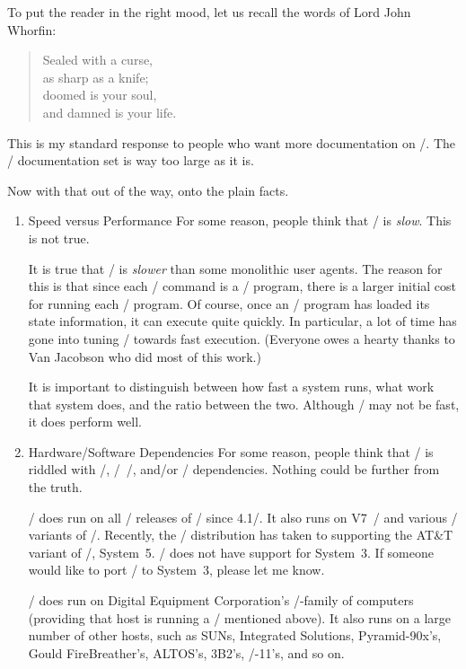 To put the reader in the right mood,
let us recall the words of Lord John Whorfin:

\begin{verse}
Sealed with a curse,\\
\qquad as sharp as a knife;\\
doomed is your soul,\\
\qquad and damned is your life.
\end{verse}

This is my standard response to people who want more documentation on \MH/.
The \MH/ documentation set is way too large as it is.

Now with that out of the way,
onto the plain facts.

\begin{enumerate}
\item	Speed versus Performance\hbreak
For some reason,
people think that \MH/ is {\em slow}.
This is not true.

It is true that \MH/ is {\em slower\/} than some monolithic user agents.
The reason for this is that since each \MH/ command is a \unix/ program,
there is a larger initial cost for running each \MH/ program.
Of course,
once an \MH/ program has loaded its state information,
it can execute quite quickly.
In particular,
a lot of time has gone into tuning \MH/ towards fast execution.
(Everyone owes a hearty thanks to Van Jacobson who did most of this work.)

It is important to distinguish between how fast a system runs,
what work that system does,
and the ratio between the two.
Although \MH/ may not be fast,
it does perform well.

\item	Hardware/Software Dependencies\hbreak
For some reason,
people think that \MH/ is riddled with \vax/, \bsd/~\unix/, and/or \SendMail/
dependencies.
Nothing could be further from the truth.

\MH/ does run on all \bsd/ releases of \unix/ since 4.1\bsd/.
It also runs on V7~\unix/ and various \xenix/ variants of \unix/.
Recently, the \MH/ distribution has taken to supporting the AT\&T variant of
\unix/, System~5.
\MH/ does not have support for System~3.
If someone would like to port \MH/ to System~3,
please let me know.

\MH/ does run on Digital Equipment Corporation's \vax/-family of computers
(providing that host is running a \unix/ mentioned above).
It also runs on a large number of other hosts,
such as SUNs, Integrated Solutions, Pyramid-90x's, Gould FireBreather's, 
ALTOS's, 3B2's, \pdp/-11's, and so on.


\end{enumerate}
